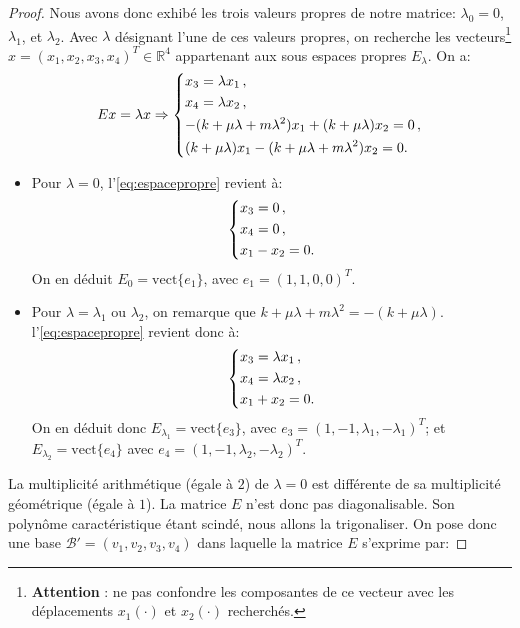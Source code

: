 \begin{proof}
\noindent Nous avons donc exhibé les trois valeurs propres de notre matrice: $\lambda_0 = 0$, $\lambda_1$, et $\lambda_2$. Avec $\lambda$ désignant l'une de ces valeurs propres, on recherche les vecteurs\footnote{\textbf{Attention} : ne pas confondre les composantes de ce vecteur avec les déplacements $x_1(\cdot)$ et $x_2(\cdot)$ recherchés.} $x = (x_1, x_2, x_3, x_4)^T \in \mathbb{R}^4$ appartenant aux sous espaces propres $E_\lambda$. On a:
\begin{align} \label{eq:espacepropre}
    Ex = \lambda x \Rightarrow \begin{dcases}
        x_3 = \lambda x_1 \,, \\
        x_4 = \lambda x_2 \,, \\
        -(k + \mu \lambda + m \lambda^2) x_1 + (k + \mu \lambda) x_2 = 0 \,, \\
        (k + \mu \lambda) x_1 - (k + \mu \lambda + m \lambda^2) x_2 = 0 .
    \end{dcases}
\end{align}
\begin{itemize}
    \item Pour $\lambda = 0$, l'\cref{eq:espacepropre} revient à:
    \begin{align*}
        \begin{dcases}            
        x_3 = 0 \,, \\
        x_4 = 0 \,, \\
        x_1 - x_2 = 0 .
        \end{dcases}
    \end{align*} 
    On en déduit $E_0 = \text{vect}\{ e_1 \}$, avec $e_1 = (1,1,0,0)^T$.
    \item Pour $\lambda = \lambda_1$ ou $\lambda_2$, on remarque que $k + \mu \lambda + m \lambda^2 = - (k + \mu \lambda)$. l'\cref{eq:espacepropre} revient donc à:
    \begin{align*}
        \begin{dcases}            
        x_3 = \lambda x_1 \,, \\
        x_4 = \lambda x_2 \,, \\
        x_1 + x_2 = 0 .
        \end{dcases}
    \end{align*} 
    On en déduit donc $E_{\lambda_1} = \text{vect}\{ e_3 \}$, avec $e_3 = (1,-1,\lambda_1,-\lambda_1)^T$; et $E_{\lambda_2} = \text{vect}\{ e_4 \}$ avec $e_4 = (1,-1,\lambda_2,-\lambda_2)^T$.
\end{itemize}
La multiplicité arithmétique (égale à $2$) de $\lambda = 0$ est différente de sa multiplicité géométrique (égale à $1$). La matrice $E$ n'est donc pas diagonalisable. Son polynôme caractéristique étant scindé, nous allons la trigonaliser. On pose donc une base $\mathcal{B}' = (v_1, v_2, v_3, v_4)$ dans laquelle la matrice $E$ s'exprime par:

\end{proof}
